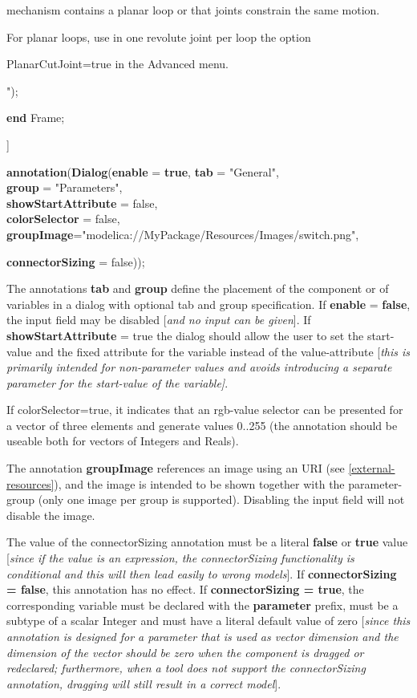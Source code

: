\documentclass[10pt,a4paper]{report}
\begin{document}
mechanism contains a planar loop or that joints constrain the same
motion.

For planar loops, use in one revolute joint per loop the option

PlanarCutJoint=true in the Advanced menu.

");

\textbf{end} Frame;

{]}

\textbf{annotation}(\textbf{Dialog}(\textbf{enable} = \textbf{true},
\textbf{tab} = "General",\\
\textbf{group} = "Parameters",\\
\textbf{showStartAttribute} = false,\\
\textbf{colorSelector} = false,\\
\textbf{groupImage}="modelica://MyPackage/Resources/Images/switch.png",

\textbf{connectorSizing} = false));

The annotations \textbf{tab} and \textbf{group} define the placement of
the component or of variables in a dialog with optional tab and group
specification. If \textbf{enable} = \textbf{false}, the input field may
be disabled {[}\emph{and no input can be given}{]}. If
\textbf{showStartAttribute} = true the dialog should allow the user to
set the start-value and the fixed attribute for the variable instead of
the value-attribute {[}\emph{this is primarily intended for
non-parameter values and avoids introducing a separate parameter for the
start-value of the variable{]}}.

If colorSelector=true, it indicates that an rgb-value selector can be
presented for a vector of three elements and generate values 0..255 (the
annotation should be useable both for vectors of Integers and Reals).

The annotation \textbf{groupImage} references an image using an URI (see
\ref{external-resources}), and the image is intended to be shown together with the
parameter-group (only one image per group is supported). Disabling the
input field will not disable the image.

The value of the connectorSizing annotation must be a literal
\textbf{false} or \textbf{true} value {[}\emph{since if the value is an
expression, the connectorSizing functionality is conditional and this
will then lead easily to wrong models}{]}. If \textbf{connectorSizing =
false}, this annotation has no effect. If \textbf{connectorSizing =
true}, the corresponding variable must be declared with the
\textbf{parameter} prefix, must be a subtype of a scalar Integer and
must have a literal default value of zero {[}\emph{since this annotation
is designed for a parameter that is used as vector dimension and the
dimension of the vector should be zero when the component is dragged or
redeclared; furthermore, when a tool does not support the
connectorSizing annotation, dragging will still result in a correct
model}{]}.
\end{document}
